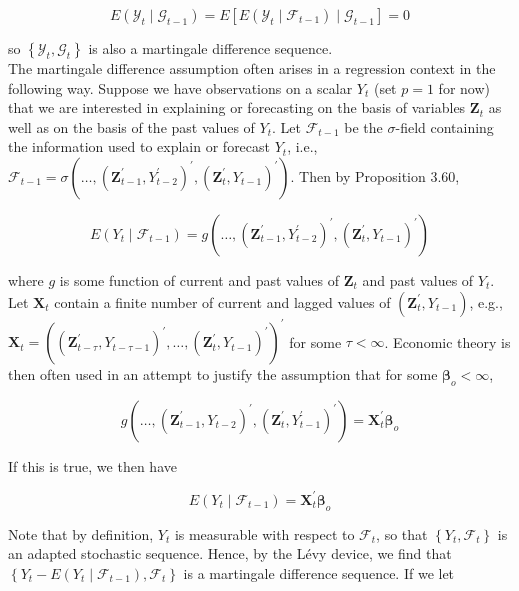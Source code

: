 \documentclass[10pt]{article}
\begin{document}
$$
E\left(\mathcal{Y}_{t} \mid \mathcal{G}_{t-1}\right)=E\left[E\left(\mathcal{Y}_{t} \mid \mathcal{F}_{t-1}\right) \mid \mathcal{G}_{t-1}\right]=0
$$

so $\left\{\mathcal{Y}_{t}, \mathcal{G}_{t}\right\}$ is also a martingale difference sequence.\\
The martingale difference assumption often arises in a regression context in the following way. Suppose we have observations on a scalar $Y_{t}$ (set $p=1$ for now) that we are interested in explaining or forecasting on the basis of variables $\mathbf{Z}_{t}$ as well as on the basis of the past values of $Y_{t}$. Let $\mathcal{F}_{t-1}$ be the $\sigma$-field containing the information used to explain or forecast $Y_{t}$, i.e., $\mathcal{F}_{t-1}=\sigma\left(\ldots,\left(\mathbf{Z}_{t-1}^{\prime}, Y_{t-2}^{\prime}\right)^{\prime},\left(\mathbf{Z}_{t}^{\prime}, Y_{t-1}\right)^{\prime}\right)$. Then by Proposition 3.60,

$$
E\left(Y_{t} \mid \mathcal{F}_{t-1}\right)=g\left(\ldots,\left(\mathbf{Z}_{t-1}^{\prime}, Y_{t-2}^{\prime}\right)^{\prime},\left(\mathbf{Z}_{t}^{\prime}, Y_{t-1}\right)^{\prime}\right)
$$

where $g$ is some function of current and past values of $\mathbf{Z}_{t}$ and past values of $Y_{t}$. Let $\mathbf{X}_{t}$ contain a finite number of current and lagged values of $\left(\mathbf{Z}_{t}^{\prime}, Y_{t-1}\right)$, e.g., $\mathbf{X}_{t}=\left(\left(\mathbf{Z}_{t-\tau}^{\prime}, Y_{t-\tau-1}\right)^{\prime}, \ldots,\left(\mathbf{Z}_{t}^{\prime}, Y_{t-1}\right)^{\prime}\right)^{\prime}$ for some $\tau<\infty$. Economic theory is then often used in an attempt to justify the assumption that for some $\boldsymbol{\beta}_{o}<\infty$,

$$
g\left(\ldots,\left(\mathbf{Z}_{t-1}^{\prime}, Y_{t-2}\right)^{\prime},\left(\mathbf{Z}_{t}^{\prime}, Y_{t-1}^{\prime}\right)^{\prime}\right)=\mathbf{X}_{t}^{\prime} \boldsymbol{\beta}_{o}
$$

If this is true, we then have

$$
E\left(Y_{t} \mid \mathcal{F}_{t-1}\right)=\mathbf{X}_{t}^{\prime} \boldsymbol{\beta}_{o}
$$

Note that by definition, $Y_{t}$ is measurable with respect to $\mathcal{F}_{t}$, so that $\left\{Y_{t}, \mathcal{F}_{t}\right\}$ is an adapted stochastic sequence. Hence, by the Lévy device, we find that $\left\{Y_{t}-E\left(Y_{t} \mid \mathcal{F}_{t-1}\right), \mathcal{F}_{t}\right\}$ is a martingale difference sequence. If we let
\end{document}
